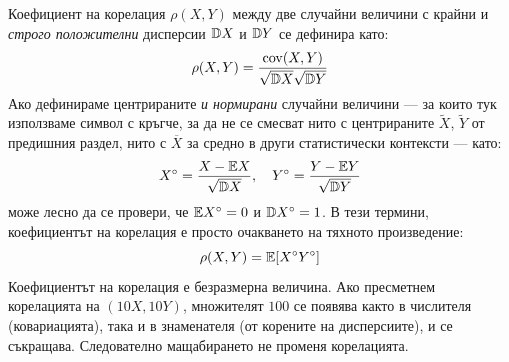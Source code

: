 \begin{defn}
Коефициент на корелация $\rho(X, Y)$ между две случайни величини с крайни и \emph{строго положителни} дисперсии $\mathbb{D} X$ и $\mathbb{D} Y$ се дефинира като:
\[
\rho(X, Y) = \frac{\operatorname{cov}(X, Y)}{\sqrt{\mathbb{D} X} \sqrt{\mathbb{D} Y}}
\]
Ако дефинираме центрираните \emph{и нормирани} случайни величини — за които тук
използваме символ с кръгче, за да не се смесват нито с центрираните
$\widetilde{X}$, $\widetilde{Y}$ от предишния раздел, нито с $\overline X$ за средно
в други статистически контексти — като:
\[
X^\circ = \frac{X - \mathbb{E} X}{\sqrt{\mathbb{D} X}}, \quad Y^\circ = \frac{Y - \mathbb{E} Y}{\sqrt{\mathbb{D} Y}}
\]
може лесно да се провери, че $\mathbb{E} X^\circ = 0$ и $\mathbb{D} X^\circ = 1$. В тези термини, коефициентът на корелация е просто очакването на тяхното произведение:
\[
\rho(X, Y) = \mathbb{E}[X^\circ Y^\circ]
\]
Коефициентът на корелация е безразмерна величина. Ако пресметнем корелацията на $(10X, 10Y)$, множителят $100$ се появява както в числителя (ковариацията), така и в знаменателя (от корените на дисперсиите), и се съкращава. Следователно мащабирането не променя корелацията.
\end{defn}

